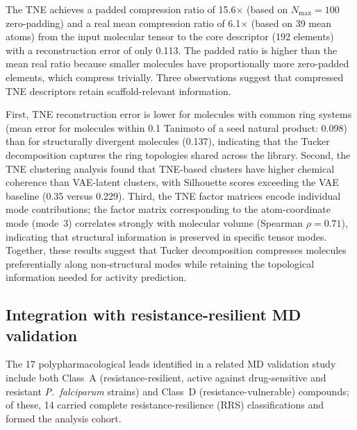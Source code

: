 \documentclass[11pt,a4paper]{article}
\begin{document}
The TNE achieves a padded compression ratio of \num{15.6}$\times$ (based on $N_{\max}=100$ zero-padding) and a real mean compression ratio of \num{6.1}$\times$ (based on \num{39} mean atoms) from the input molecular tensor to the core descriptor (\num{192} elements) with a reconstruction error of only 0.113. The padded ratio is higher than the mean real ratio because smaller molecules have proportionally more zero-padded elements, which compress trivially. Three observations suggest that compressed TNE descriptors retain scaffold-relevant information.

First, TNE reconstruction error is lower for molecules with common ring systems (mean error for molecules within \num{0.1} Tanimoto of a seed natural product: \num{0.098}) than for structurally divergent molecules (\num{0.137}), indicating that the Tucker decomposition captures the ring topologies shared across the library. Second, the TNE clustering analysis found that TNE-based clusters have higher chemical coherence than VAE-latent clusters, with Silhouette scores exceeding the VAE baseline (\num{0.35} versus \num{0.229}). Third, the TNE factor matrices encode individual mode contributions; the factor matrix corresponding to the atom-coordinate mode (mode~3) correlates strongly with molecular volume (Spearman $\rho = \num{0.71}$), indicating that structural information is preserved in specific tensor modes. Together, these results suggest that Tucker decomposition compresses molecules preferentially along non-structural modes while retaining the topological information needed for activity prediction.



\subsection{Integration with resistance-resilient MD validation}


The 17 polypharmacological leads identified in a related MD validation study \citep{temgoua2027md} include both Class~A (resistance-resilient, active against drug-sensitive and resistant \textit{P.~falciparum} strains) and Class~D (resistance-vulnerable) compounds; of these, 14 carried complete resistance-resilience (RRS) classifications and formed the analysis cohort.
\end{document}
